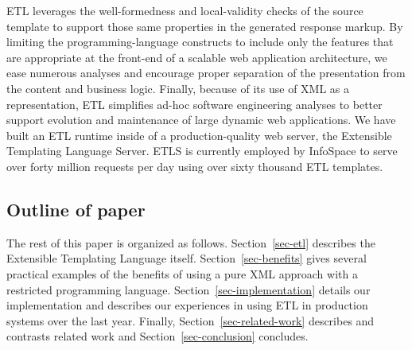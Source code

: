 \documentclass{www2003-submission}
\newcommand{\secref}[1]{Section~\ref{sec-#1}}
\begin{document}
ETL leverages the well-formedness and local-validity checks of the
source template to support those same properties in the generated
response markup.  By limiting the programming-language constructs to
include only the features that are appropriate at the front-end of a
scalable web application architecture, we ease numerous analyses and
encourage proper separation of the presentation from the content and
business logic. Finally, because of its use of XML as a
representation, ETL simplifies ad-hoc software engineering analyses to
better support evolution and maintenance of large dynamic web
applications.  We have built an ETL runtime inside of a
production-quality web server, the Extensible Templating Language
Server.  ETLS is currently employed by InfoSpace to serve over forty
million requests per day using over sixty thousand ETL templates.

\subsection{Outline of paper}

The rest of this paper is organized as follows. \secref{etl} describes
the Extensible Templating Language itself. \secref{benefits} gives
several practical examples of the benefits of using a pure XML
approach with a restricted programming language. 
\secref{implementation} details our implementation and
describes our experiences in using ETL in production systems over the
last year.  Finally, \secref{related-work} describes and contrasts
related work and \secref{conclusion} concludes.





\end{document}
